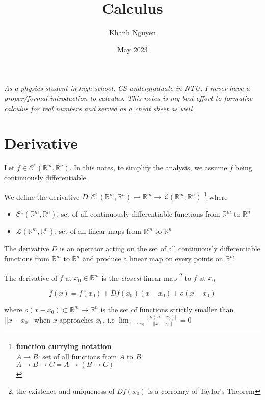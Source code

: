 \documentclass{article}
\title{
    \large Calculus
}
\author{Khanh Nguyen}
\date{May 2023}
\begin{document}
\maketitle

\emph{As a physics student in high school, CS undergraduate in NTU, I never have a proper/formal introduction to calculus. This notes is my best effort to formalize calculus for real numbers and served as a cheat sheet as well}

\section{Derivative}

Let $f \in \mathcal{C}^1(\mathbb{R}^m, \mathbb{R}^n)$. In this notes, to simplify the analysis, we assume $f$ being continuously differentiable.

We define the derivative $D: \mathcal{C}^1(\mathbb{R}^m, \mathbb{R}^n) \to \mathbb{R}^m \to \mathcal{L}(\mathbb{R}^m, \mathbb{R}^n)$ \footnote{
    \textbf{function currying notation} \\
    $A \to B$: set of all functions from $A$ to $B$ \\
    $A \to B \to C = A \to (B \to  C)$ \\
}
where

\begin{itemize}
    \item $\mathcal{C}^1(\mathbb{R}^m, \mathbb{R}^n)$: set of all continuously differentiable functions from $\mathbb{R}^m$ to $\mathbb{R}^n$
    \item $\mathcal{L}(\mathbb{R}^m, \mathbb{R}^n)$: set of all linear maps from $\mathbb{R}^m$ to $\mathbb{R}^n$
\end{itemize}

The derivative $D$ is an operator acting on the set of all continuously differentiable functions from $\mathbb{R}^m$ to $\mathbb{R}^n$ and produce a linear map on every points on $\mathbb{R}^m$

The derivative of $f$ at $x_0 \in \mathbb{R}^m$ is the \emph{closest} linear map \footnote{the existence and uniqueness of $Df(x_0)$ is a corrolary of Taylor's Theorem} to $f$ at $x_0$ 

\begin{equation}
    f(x) = f(x_0) + Df(x_0) (x - x_0) + o(x - x_0)
\end{equation}

where $o(x - x_0) \subset \mathbb{R}^m \to \mathbb{R}^n$ is the set of functions strictly smaller than $||x - x_0||$ when $x$ approaches $x_0$, i.e $\lim_{x \to x_0} \frac{||o(x - x_0)||}{||x - x_0||} = 0$
\end{document}

